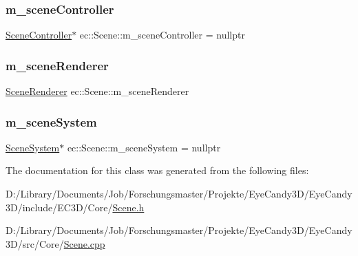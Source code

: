 \mbox{\label{classec_1_1_scene_aa6a8f71066fc44162b1c80341840d5fb}} 
\subsubsection{\texorpdfstring{m\+\_\+scene\+Controller}{m\_sceneController}}
{\footnotesize\ttfamily \mbox{\hyperlink{classec_1_1_scene_controller}{Scene\+Controller}}$\ast$ ec\+::\+Scene\+::m\+\_\+scene\+Controller = nullptr\hspace{0.3cm}{\ttfamily [protected]}}

\mbox{\label{classec_1_1_scene_a17a2c241cec6bda0a5895b353aa28fa7}} 
\subsubsection{\texorpdfstring{m\+\_\+scene\+Renderer}{m\_sceneRenderer}}
{\footnotesize\ttfamily \mbox{\hyperlink{classec_1_1_scene_renderer}{Scene\+Renderer}} ec\+::\+Scene\+::m\+\_\+scene\+Renderer\hspace{0.3cm}{\ttfamily [protected]}}

\mbox{\label{classec_1_1_scene_ad63e472baf8e283c596891384ea98aad}} 
\subsubsection{\texorpdfstring{m\+\_\+scene\+System}{m\_sceneSystem}}
{\footnotesize\ttfamily \mbox{\hyperlink{classec_1_1_scene_system}{Scene\+System}}$\ast$ ec\+::\+Scene\+::m\+\_\+scene\+System = nullptr\hspace{0.3cm}{\ttfamily [protected]}}



The documentation for this class was generated from the following files\+:\begin{DoxyCompactItemize}
\item 
D\+:/\+Library/\+Documents/\+Job/\+Forschungsmaster/\+Projekte/\+Eye\+Candy3\+D/\+Eye\+Candy3\+D/include/\+E\+C3\+D/\+Core/\mbox{\hyperlink{_scene_8h}{Scene.\+h}}\item 
D\+:/\+Library/\+Documents/\+Job/\+Forschungsmaster/\+Projekte/\+Eye\+Candy3\+D/\+Eye\+Candy3\+D/src/\+Core/\mbox{\hyperlink{_scene_8cpp}{Scene.\+cpp}}\end{DoxyCompactItemize}
